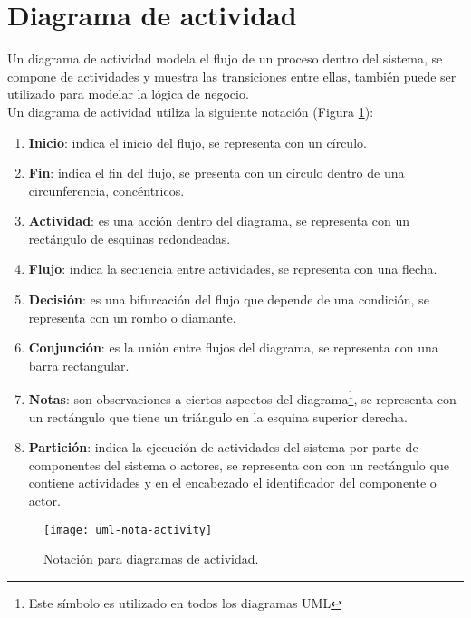\section{Diagrama de actividad}\label{sec:uml-act}
Un diagrama de actividad modela el flujo de un proceso dentro del sistema, se compone de actividades y muestra las transiciones entre ellas, también puede ser utilizado para modelar la lógica de negocio\cite{UMLClassroom, SoftwareEngineeringUML}.\\
Un diagrama de actividad utiliza la siguiente notación\cite{UMLClassroom, SoftwareEngineeringUML} (Figura \ref{fig:uml-nota-activity}):
\begin{enumerate}
  \item \textbf{Inicio}: indica el inicio del flujo, se representa con un círculo.
  \item \textbf{Fin}: indica el fin del flujo, se presenta con un círculo dentro de una circunferencia, concéntricos.
  \item \textbf{Actividad}: es una acción dentro del diagrama, se representa con un rectángulo de esquinas redondeadas.
  \item \textbf{Flujo}: indica la secuencia entre actividades, se representa con una flecha.
  \item \textbf{Decisión}: es una bifurcación del flujo que depende de una condición, se representa con un rombo o diamante.
  \item \textbf{Conjunción}: es la unión entre flujos del diagrama, se representa con una barra rectangular.
  \item \textbf{Notas}: son observaciones a ciertos aspectos del diagrama\footnote{Este símbolo es utilizado en todos los diagramas UML}, se representa con un rectángulo que tiene un triángulo en la esquina superior derecha.
  \item \textbf{Partición}: indica la ejecución de actividades del sistema por parte de componentes del sistema o actores, se representa con con un rectángulo que contiene actividades y en el encabezado el identificador del componente o actor.
\end{enumerate}

\begin{figure}[h]
  \centering
  \texttt{[image: uml-nota-activity]}
  \caption{Notación para diagramas de actividad\cite{SoftwareEngineeringUML}.}
  \label{fig:uml-nota-activity}
\end{figure}

